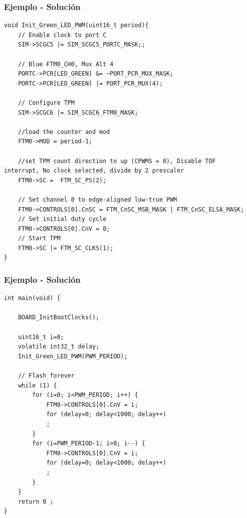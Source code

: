 \documentclass[10.5pt,scale=1.0,t,aspectratio=169,hyperref={pdfpagelabels=false}]{beamer}
\begin{document}
\begin{frame}[fragile]
	\frametitle{Ejemplo - Solución}
	\vspace{-0.2cm}
	{\footnotesize
	\begin{lstlisting}[style=CStyle]
void Init_Green_LED_PWM(uint16_t period){
	// Enable clock to port C
	SIM->SCGC5 |= SIM_SCGC5_PORTC_MASK;;
	
	// Blue FTM0_CH0, Mux Alt 4
	PORTC->PCR[LED_GREEN] &= ~PORT_PCR_MUX_MASK;
	PORTC->PCR[LED_GREEN] |= PORT_PCR_MUX(4);
	
	// Configure TPM
	SIM->SCGC6 |= SIM_SCGC6_FTM0_MASK;
	
	//load the counter and mod
	FTM0->MOD = period-1;
	
	//set TPM count direction to up (CPWMS = 0), Disable TOF interrupt, No clock selected, divide by 2 prescaler
	FTM0->SC =  FTM_SC_PS(2);
	
	// Set channel 0 to edge-aligned low-true PWM
	FTM0->CONTROLS[0].CnSC = FTM_CnSC_MSB_MASK | FTM_CnSC_ELSA_MASK;
	// Set initial duty cycle
	FTM0->CONTROLS[0].CnV = 0;
	// Start TPM
	FTM0->SC |= FTM_SC_CLKS(1);
}
	\end{lstlisting}
	}
\end{frame}
\begin{frame}[fragile]
	\frametitle{Ejemplo - Solución}
	\vspace{-0.2cm}
	{\footnotesize
		\begin{lstlisting}[style=CStyle]
int main(void) {
	
	BOARD_InitBootClocks();
	
	uint16_t i=0;
	volatile int32_t delay;
	Init_Green_LED_PWM(PWM_PERIOD);
	
	// Flash forever
	while (1) {
		for (i=0; i<PWM_PERIOD; i++) {
			FTM0->CONTROLS[0].CnV = i;
			for (delay=0; delay<1000; delay++)
			;
		}
		for (i=PWM_PERIOD-1; i>0; i--) {
			FTM0->CONTROLS[0].CnV = i;
			for (delay=0; delay<1000; delay++)
			;
		}
	}
	return 0 ;
}
		\end{lstlisting}
	}
\end{frame}
\frame{
\begin{center}
	\LARGE \textcolor{blue}{TEMPORIZADORES}
\end{center}

\begin{center}
	\LARGE \textcolor{blue}{GRACIAS}
\end{center}
}

\end{document}
